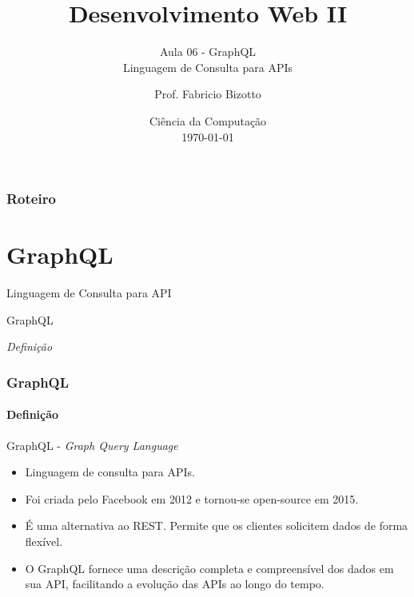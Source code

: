 \documentclass[
	9pt, %
	t, %
]{beamer}
\title[DesWebII]{Desenvolvimento Web II} %
\subtitle{Aula 06 - GraphQL \\Linguagem de Consulta para APIs} %
\author[Fabricio Bizotto]{Prof. Fabricio Bizotto} %
\institute[IFC]{Instituto Federal Catarinense \\ \smallskip \textit{fabricio.bizotto@ifc.edu.br}} %
\date[\today]{Ciência da Computação \\ \today} %
\begin{document}

\begin{frame}
	\titlepage %
\end{frame}


\begin{frame}
	\frametitle{Roteiro} %

	\tableofcontents %
\end{frame}


\section{GraphQL}

\begin{frame}
	\begin{center}

		\bigskip\bigskip\bigskip\bigskip %
		{\Large Linguagem de Consulta para API}

		\bigskip\bigskip %
		{\Huge GraphQL}

		\smallskip
		{\small \textit{Definição}}
	\end{center}

\end{frame}

\begin{frame}
	\frametitle{GraphQL}
	\framesubtitle{Definição}

	\begin{block}{GraphQL - \textit{Graph Query Language}}
		\begin{itemize}
			\item Linguagem de consulta para APIs.
			\item Foi criada pelo Facebook em 2012 e tornou-se open-source em 2015.
			\item É uma alternativa ao REST. Permite que os clientes solicitem dados de forma flexível.
			\item O GraphQL fornece uma descrição completa e compreensível dos dados em sua API,
			      facilitando a evolução das APIs ao longo do tempo.
		\end{itemize}
	\end{block}

\end{frame}
\end{document}
